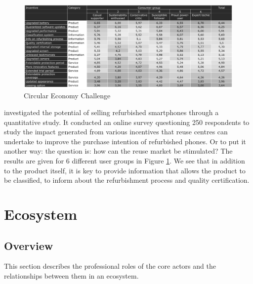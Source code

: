 \documentclass[
]{book}
\begin{document}
\begin{figure}

{\centering \includegraphics[width=1\linewidth]{./figs/1g} 

}

\caption{Circular Economy Challenge}\label{fig:figmugge}
\end{figure}

\citet{Mugge2017} investigated the potential of selling refurbished smartphones through a quantitative study. It conducted an online survey questioning 250 respondents to study the impact generated from various incentives that reuse centres can undertake to improve the purchase intention of refurbished phones. Or to put it another way: the question is: how can the reuse market be stimulated? The results are given for 6 different user groups in Figure \ref{fig:figmugge}. We see that in addition to the product itself, it is key to provide information that allows the product to be classified, to inform about the refurbishment process and quality certification.

\hypertarget{ecosystem}{%
\chapter{Ecosystem}\label{ecosystem}}

\hypertarget{overview}{%
\section{Overview}\label{overview}}

This section describes the professional roles of the core actors and the relationships between them in an ecosystem.
\end{document}
